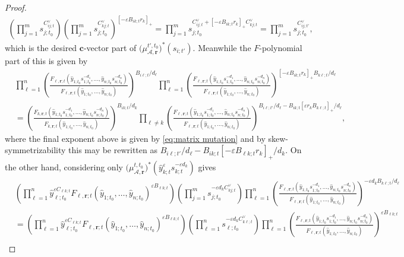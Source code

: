 \documentclass{amsart}
\numberwithin{equation}{section}
\newcommand{\bfc}{\mathbf{c}}
\newcommand{\bfr}{{\boldsymbol{r}}}
\newcommand{\cA}{\mathcal{A}}
\begin{document}
\begin{proof}
\begin{align*}
    \left(\prod_{j=1}^m s_{j;t_0}^{C^\vee_{ij;t}}\right)\left(\prod_{j=1}^m s_{j;t_0}^{C^\vee_{kj;t}}\right)^{[-\varepsilon B_{ik;t} r_k]_+}
    =\prod_{j=1}^m s_{j;t_0}^{C^\vee_{ij;t} + [-\varepsilon B_{ik;t} r_k]_+ C^\vee_{kj;t}}
    =\prod_{j=1}^m s_{j;t_0}^{C^\vee_{ij;t'}},
  \end{align*}
  which is the desired $\bfc$-vector part of $\big(\mu_{\cA,\bfr}^{t',t_0}\big)^*(s_{i;t'})$.
  Meanwhile the $F$-polynomial part of this is given by
  \begin{align*}
    &\prod_{\ell=1}^n \left(\frac{F_{\ell,\bfr;t}(\hat y_{1;t_0} s_{1;t_0}^{-d_1},\ldots,\hat y_{n;t_0} s_{n;t_0}^{-d_n})}{F_{\ell,\bfr;t}(\hat y_{1;t_0},\ldots,\hat y_{n;t_0})}\right)^{B_{i\ell;t}/d_\ell}
    \prod_{\ell=1}^n \left(\frac{F_{\ell,\bfr;t}(\hat y_{1;t_0} s_{1;t_0}^{-d_1},\ldots,\hat y_{n;t_0} s_{n;t_0}^{-d_n})}{F_{\ell,\bfr;t}(\hat y_{1;t_0},\ldots,\hat y_{n;t_0})}\right)^{[-\varepsilon B_{ik;t} r_k]_+ B_{k\ell;t}/d_\ell}\\
    & = \left(\frac{F_{k,\bfr;t}(\hat y_{1;t_0} s_{1;t_0}^{-d_1},\ldots,\hat y_{n;t_0} s_{n;t_0}^{-d_n})}{F_{k,\bfr;t}(\hat y_{1;t_0},\ldots,\hat y_{n;t_0})}\right)^{B_{ik;t}/d_k}
    \prod_{\ell\ne k} \left(\frac{F_{\ell,\bfr;t}(\hat y_{1;t_0} s_{1;t_0}^{-d_1},\ldots,\hat y_{n;t_0} s_{n;t_0}^{-d_n})}{F_{\ell,\bfr;t}(\hat y_{1;t_0},\ldots,\hat y_{n;t_0})}\right)^{B_{i\ell;t'}/d_\ell-B_{ik;t} [\varepsilon r_k B_{k\ell;t}]_+/d_\ell},
  \end{align*}
  where the final exponent above is given by \eqref{eq:matrix mutation} and by skew-symmetrizability this may be rewritten as $B_{i\ell;t'}/d_\ell-B_{ik;t} [-\varepsilon B_{\ell k;t} r_k]_+/d_k$.
  On the other hand, considering only $\big(\mu_{\cA,\bfr}^{t,t_0}\big)^*\left(\hat y_{k;t}^\varepsilon s_{k;t}^{-\varepsilon d_k}\right)$ gives
  \begin{align*}
    \nonumber &\left(\prod_{\ell=1}^n \hat y_{\ell;t_0}^{\varepsilon C_{\ell k;t}} F_{\ell,\bfr;t}(\hat y_{1;t_0},\ldots,\hat y_{n;t_0})^{\varepsilon B_{\ell k;t}}\right) \left(\prod_{j=1}^m s_{j;t_0}^{-\varepsilon d_k C^\vee_{kj;t}}\right) \prod_{\ell=1}^n \left(\frac{F_{\ell,\bfr;t}(\hat y_{1;t_0} s_{1;t_0}^{-d_1},\ldots,\hat y_{n;t_0} s_{n;t_0}^{-d_n})}{F_{\ell,\bfr;t}(\hat y_{1;t_0},\ldots,\hat y_{n;t_0})}\right)^{-\varepsilon d_k B_{k\ell;t}/d_\ell}\\
    \nonumber &=\left(\prod_{\ell=1}^n \hat y_{\ell;t_0}^{\varepsilon C_{\ell k;t}} F_{\ell,\bfr;t}(\hat y_{1;t_0},\ldots,\hat y_{n;t_0})^{\varepsilon B_{\ell k;t}}\right) \left(\prod_{\ell=1}^n s_{\ell;t_0}^{-\varepsilon d_k C^\vee_{k\ell;t}}\right) \prod_{\ell=1}^n \left(\frac{F_{\ell,\bfr;t}(\hat y_{1;t_0} s_{1;t_0}^{-d_1},\ldots,\hat y_{n;t_0} s_{n;t_0}^{-d_n})}{F_{\ell,\bfr;t}(\hat y_{1;t_0},\ldots,\hat y_{n;t_0})}\right)^{\varepsilon B_{\ell k;t}}\\

\end{align*}
\end{proof}
\end{document}

